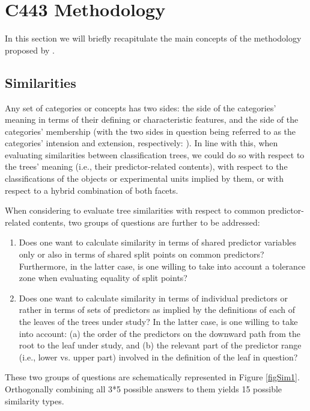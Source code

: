 \section{C443 Methodology} \label{sec:methodology}
In this section we will briefly recapitulate the main concepts of the methodology proposed by \citet{Sies2020}.

\subsection{Similarities}
Any set of categories or concepts has two sides: the side of the categories' meaning in terms of their defining or characteristic features, and the side of the categories' membership (with the two sides in question being referred to as the categories' intension and extension, respectively: \citet{leibniz1764}). In line with this, when evaluating similarities between classification trees, we could do so with respect to the trees' meaning (i.e., their predictor-related contents), with respect to the classifications of the objects or experimental units implied by them, or with respect to a hybrid combination of both facets.

When considering to evaluate tree similarities with respect to common predictor-related contents, two groups of questions are further to be addressed:
\begin{enumerate}
\item{Does one want to calculate similarity in terms of shared predictor variables only or also in terms of shared split points on common predictors? Furthermore, in the latter case, is one willing to take into account a tolerance zone when evaluating equality of split points?}
\item{Does one want to calculate similarity in terms of individual predictors or rather in terms of sets of predictors as implied by the definitions of each of the leaves of the trees under study? In the latter case, is one willing to take into account: (a) the order of the predictors on the downward path from the root to the leaf under study, and (b) the relevant part of the predictor range (i.e., lower vs. upper part) involved in the definition of the leaf in question?}
\end{enumerate}
These two groups of questions are schematically represented in Figure \ref{figSim1}. Orthogonally combining all 3*5 possible answers to them yields 15 possible similarity types.


